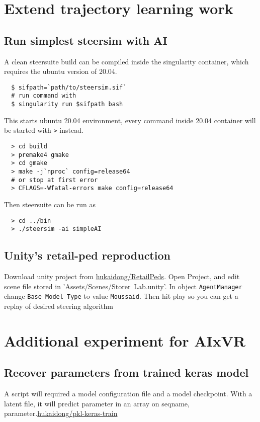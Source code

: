 \chapter{Extend trajectory learning work}

\section{Run simplest steersim with AI}

A clean steersuite build can be compiled inside the singularity container, 
which requires the ubuntu version of 20.04.

\begin{verbatim}
  $ sifpath=`path/to/steersim.sif`
  # run command with
  $ singularity run $sifpath bash
\end{verbatim}

This starts ubuntu 20.04 environment, every command inside 20.04 container will 
be started with \texttt{>} instead.

\begin{verbatim}
  > cd build
  > premake4 gmake
  > cd gmake
  > make -j`nproc` config=release64
  # or stop at first error
  > CFLAGS=-Wfatal-errors make config=release64
\end{verbatim}

Then steersuite can be run as
\begin{verbatim}
  > cd ../bin
  > ./steersim -ai simpleAI
\end{verbatim}

\section{Unity's retail-ped reproduction}

Download unity project from \href{ 
https://github.com/hukaidong/RetailPeds/tree/a46f14017152f101e3e420522edc3b41b4406dbc 
}{hukaidong/RetailPeds}. Open Project, and edit scene file stored in 
'Assets/Scenes/Storer~Lab.unity'. In object \texttt{AgentManager} 
change \texttt{Base Model Type} to value 
\texttt{Moussaid}. Then hit play so you can get a replay of desired 
steering algorithm \cite{moussaid2011how}
\printbibliography

\chapter{Additional experiment for AIxVR}

\section{Recover parameters from trained keras model}
A script will required a model configuration file and a model checkpoint. With 
a latent file, it will predict parameter in an array on {seqname, 
parameter}.\href{ 
  https://github.com/hukaidong/pkl-keras-train/tree/f97d8b71bf7a55fad0450452a32b71ddcf606fe9
}{hukaidong/pkl-keras-train}

